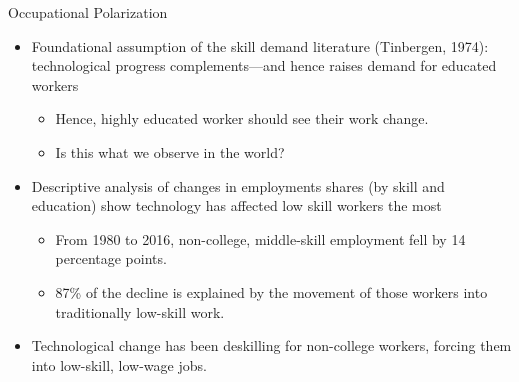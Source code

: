 \documentclass{beamer}
\begin{document}
\begin{frame}{Occupational Polarization}

\begin{itemize}
	
	\item Foundational assumption of the skill demand literature (Tinbergen, 1974): technological progress complements—and hence raises demand for educated workers
	
	\begin{itemize}
		
		\item Hence, highly educated worker should see their work change.
		
		\item Is this what we observe in the world?
		
	\end{itemize} 

	\bigskip
	
	\item Descriptive analysis of changes in employments shares (by skill and education) show technology has affected low skill workers the most
	
	\begin{itemize}
		
		\item From 1980 to 2016, non-college, middle-skill employment fell by 14 percentage points.
		
		\item 87\% of the decline is explained by the movement of those workers into traditionally low-skill work.
		
		
	\end{itemize}

	\bigskip

	\item Technological change has been deskilling for non-college workers, forcing them into low-skill, low-wage jobs.
	
\end{itemize}

\end{frame}
\end{document}
